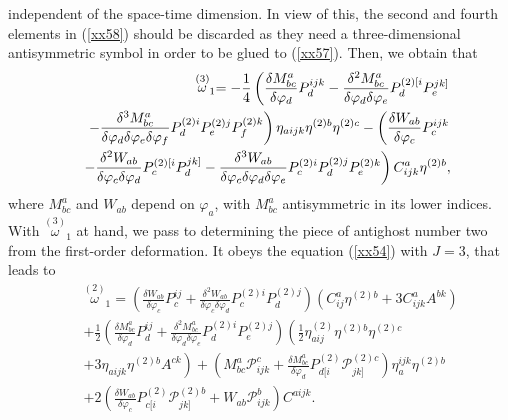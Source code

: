 \documentclass[a4paper,12pt]{article}
\begin{document}
independent of the space-time dimension. In view of this, the second and
fourth elements in (\ref{xx58}) should be discarded as they need a
three-dimensional antisymmetric symbol in order to be glued to (\ref{xx57}).
Then, we obtain that 
\begin{eqnarray}
&&\stackrel{(3)}{\omega }_{1}=-\frac{1}{4}\left( \frac{\delta M_{bc}^{a}}{%
\delta \varphi _{d}}P_{d}^{ijk}-\frac{\delta ^{2}M_{bc}^{a}}{\delta \varphi
_{d}\delta \varphi _{e}}P_{d}^{(2)[i}P_{e}^{jk]}\right.   \nonumber \\
&&\left. -\frac{\delta ^{3}M_{bc}^{a}}{\delta \varphi _{d}\delta \varphi
_{e}\delta \varphi _{f}}P_{d}^{(2)i}P_{e}^{(2)j}P_{f}^{(2)k}\right) \eta
_{aijk}\eta ^{(2)b}\eta ^{(2)c}-\left( \frac{\delta W_{ab}}{\delta \varphi
_{c}}P_{c}^{ijk}\right.   \nonumber \\
&&\left. -\frac{\delta ^{2}W_{ab}}{\delta \varphi _{c}\delta \varphi _{d}}%
P_{c}^{(2)[i}P_{d}^{jk]}-\frac{\delta ^{3}W_{ab}}{\delta \varphi _{c}\delta
\varphi _{d}\delta \varphi _{e}}P_{c}^{(2)i}P_{d}^{(2)j}P_{e}^{(2)k}\right)
C_{ijk}^{a}\eta ^{(2)b},  \label{xx59}
\end{eqnarray}
where $M_{bc}^{a}$ and $W_{ab}$ depend on $\varphi _{a}$, with $M_{bc}^{a}$
antisymmetric in its lower indices. With $\stackrel{(3)}{\omega }_{1}$ at
hand, we pass to determining the piece of antighost number two from the
first-order deformation. It obeys the equation (\ref{xx54}) with $J=3$, that
leads to 
\begin{eqnarray}
&&\stackrel{(2)}{\omega }_{1}=\left( \frac{\delta W_{ab}}{\delta \varphi _{c}%
}P_{c}^{ij}+\frac{\delta ^{2}W_{ab}}{\delta \varphi _{c}\delta \varphi _{d}}%
P_{c}^{(2)i}P_{d}^{(2)j}\right) \left( C_{ij}^{a}\eta
^{(2)b}+3C_{ijk}^{a}A^{bk}\right)   \nonumber \\
&&+\frac{1}{2}\left( \frac{\delta M_{bc}^{a}}{\delta \varphi _{d}}P_{d}^{ij}+%
\frac{\delta ^{2}M_{bc}^{a}}{\delta \varphi _{d}\delta \varphi _{e}}%
P_{d}^{(2)i}P_{e}^{(2)j}\right) \left( \frac{1}{2}\eta _{aij}^{(2)}\eta
^{(2)b}\eta ^{(2)c}\right.   \nonumber \\
&&\left. +3\eta _{aijk}\eta ^{(2)b}A^{ck}\right) +\left( M_{bc}^{a}\mathcal{P%
}_{ijk}^{c}+\frac{\delta M_{bc}^{a}}{\delta \varphi _{d}}P_{d[i}^{(2)}%
\mathcal{P}_{jk]}^{(2)c}\right) \eta _{a}^{ijk}\eta ^{(2)b}  \nonumber \\
&&+2\left( \frac{\delta W_{ab}}{\delta \varphi _{c}}P_{c[i}^{(2)}\mathcal{P}%
_{jk]}^{(2)b}+W_{ab}\mathcal{P}_{ijk}^{b}\right) C^{aijk}.  \label{xx61}
\end{eqnarray}
\end{document}
